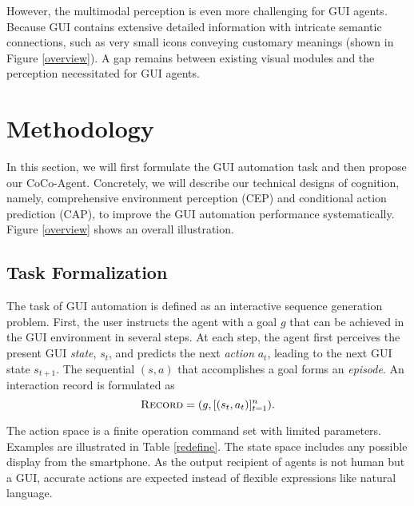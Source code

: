 However, the multimodal perception is even more challenging for GUI agents.
Because GUI contains extensive detailed information with intricate semantic connections, such as very small icons conveying customary meanings (shown in Figure \ref{overview}). 
A gap remains between existing visual modules and the perception necessitated for GUI agents.

\section{Methodology}
In this section, we will first formulate the GUI automation task and then propose our CoCo-Agent. Concretely, we will describe our technical designs of cognition, namely, comprehensive environment perception (CEP) and conditional action prediction (CAP), to improve the GUI automation performance systematically. Figure \ref{overview} shows an overall illustration.
 
\subsection{Task Formalization}
The task of GUI automation is defined as an interactive sequence generation problem.
First, the user instructs the agent with a goal $g$ that can be achieved in the GUI environment in several steps.
At each step, the agent first perceives the present GUI \textit{state}, $s_t$, and predicts the next \textit{action} $a_t$, leading to the next GUI state $s_{t+1}$.
The sequential $(s, a)$ that accomplishes a goal forms an \textit{episode}. An interaction record is formulated as
\begin{equation}
\setlength{\abovedisplayskip}{5pt}
\setlength{\belowdisplayskip}{5pt}
\textsc{Record} = (g, [(s_t, a_t)]_{t=1}^n).
\label{formalization}
\end{equation}

The action space is a finite operation command set with limited parameters. 
Examples are illustrated in Table \ref{redefine}.
The state space includes any possible display from the smartphone.
As the output recipient of agents is not human but a GUI, accurate actions are expected instead of flexible expressions like natural language.

